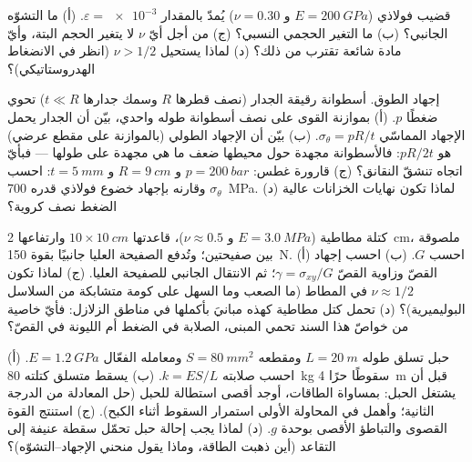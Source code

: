 \begin{exercise}[$\star$]\label{exo:b3:continuum-elasticity:4}
قضيب فولاذي ($E = \qty{200}{GPa}$ و $\nu = 0.30$) يُمدّ بالمقدار
$\varepsilon = \num{e-3}$. (أ) ما التشوّه الجانبي؟ (ب) ما التغير
الحجمي النسبي؟ (ج) من أجل أيّ $\nu$ لا يتغير الحجم البتة، وأيّ
مادة شائعة تقترب من ذلك؟ (د) لماذا يستحيل $\nu > 1/2$
(انظر في الانضغاط الهدروستاتيكي)؟
\end{exercise}

\begin{exercise}[$\star\star$]\label{exo:b3:continuum-elasticity:5}
إجهاد الطوق. أسطوانة رقيقة الجدار (نصف قطرها $R$ وسمك جدارها $t \ll
R$) تحوي ضغطًا $p$. (أ) بموازنة القوى على نصف أسطوانة طوله
واحدي، بيّن أن الجدار يحمل الإجهاد المماسّي
$\sigma_\theta = pR/t$. (ب) بيّن أن الإجهاد الطولي (بالموازنة على
مقطع عرضي) هو $pR/2t$: فالأسطوانة مجهدة حول محيطها ضعف ما هي
مجهدة على طولها --- فبأيّ اتجاه تنشقّ النقانق؟ (ج) قارورة غطس:
$p =
\qty{200}{bar}$ و $R = \qty{9}{cm}$ و $t = \qty{5}{mm}$: احسب
$\sigma_\theta$ وقارنه بإجهاد خضوع فولاذي قدره
\qty{700}{MPa}. (د) لماذا تكون نهايات الخزانات عالية الضغط نصف
كروية؟
\end{exercise}

\begin{exercise}[$\star\star$]\label{exo:b3:continuum-elasticity:6}
كتلة مطاطية ($E = \qty{3.0}{MPa}$ و $\nu \approx 0.5$)، قاعدتها $10
\times \qty{10}{cm}$ وارتفاعها \qty{2}{cm}، ملصوقة بين صفيحتين؛
وتُدفع الصفيحة العليا جانبيًا بقوة \qty{150}{N}. (أ) احسب $G$.
(ب) احسب إجهاد القصّ وزاوية القصّ $\gamma = \sigma_{xy}/G$؛ ثم
الانتقال الجانبي للصفيحة العليا. (ج) لماذا تكون $\nu \approx 1/2$
في المطاط (ما الصعب وما السهل على كومة متشابكة من السلاسل
البوليميرية)؟ (د) تحمل كتل مطاطية كهذه مبانيَ بأكملها في مناطق
الزلازل: فأيّ خاصية من خواصّ هذا السند تحمي المبنى، الصلابة في
الضغط أم الليونة في القصّ؟
\end{exercise}

\begin{exercise}[$\star\star$]\label{exo:b3:continuum-elasticity:7}
حبل تسلق طوله $L = \qty{20}{m}$ ومقطعه $S =
\qty{80}{mm^2}$ ومعامله الفعّال $E = \qty{1.2}{GPa}$. (أ) احسب
صلابته $k = ES/L$. (ب) يسقط متسلق كتلته \qty{80}{kg} سقوطًا حرًا
\qty{4}{m} قبل أن يشتغل الحبل: بمساواة الطاقات، أوجد أقصى
استطالة للحبل (حل المعادلة من الدرجة الثانية؛ وأهمل في المحاولة
الأولى استمرار السقوط أثناء الكبح). (ج) استنتج القوة القصوى
والتباطؤ الأقصى بوحدة $g$. (د) لماذا يجب إحالة حبل تحمّل سقطة
عنيفة إلى التقاعد (أين ذهبت الطاقة، وماذا يقول منحني
الإجهاد--التشوّه)؟
\end{exercise}


